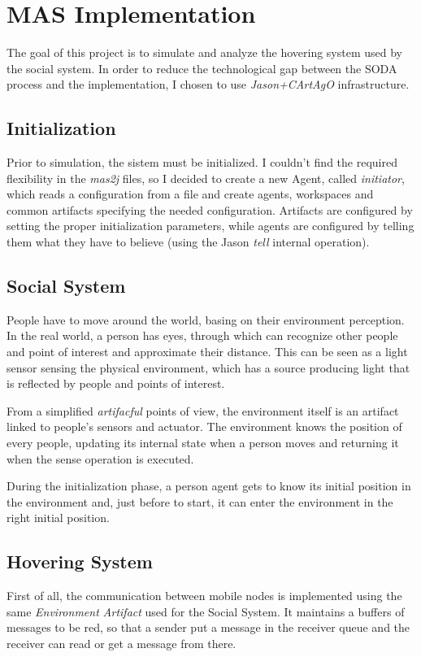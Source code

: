\section{MAS Implementation}

The goal of this project is to simulate and analyze the
hovering system used by the social system. In order to
reduce the technological gap between the SODA process and
the implementation, I chosen to use \emph{Jason+CArtAgO}
infrastructure.

\subsection{Initialization}
Prior to simulation, the sistem must be initialized. I couldn't find the
required flexibility in the \emph{mas2j} files, so I decided to create a new
Agent, called \emph{initiator}, which reads a configuration from a file and
create agents, workspaces and common artifacts specifying the needed configuration.
Artifacts are configured by setting the proper initialization parameters, while
agents are configured by telling them what they have to believe (using the
Jason \emph{tell} internal operation).

\subsection{Social System}
People have to move around the world, basing on
their environment perception. In the real world,
a person has eyes, through which can recognize other
people and point of interest and approximate their distance.
This can be seen as a light sensor sensing the
physical environment, which has a source producing light
that is reflected by people and points of interest.

From a simplified \emph{artifacful} points of view, the
environment itself is an artifact linked to people's
sensors and actuator. The environment knows the position of
every people, updating its internal state when a person moves
and returning it when the sense operation is executed.

During the initialization phase, a person agent gets to know
its initial position in the environment and, just before to start,
it can enter the environment in the right initial position.

\subsection{Hovering System}

First of all, the communication between mobile nodes is implemented using
the same \emph{Environment Artifact} used for the Social System. It
maintains a buffers of messages to be red, so that a sender put a message
in the receiver queue and the receiver can read or get a message from there.